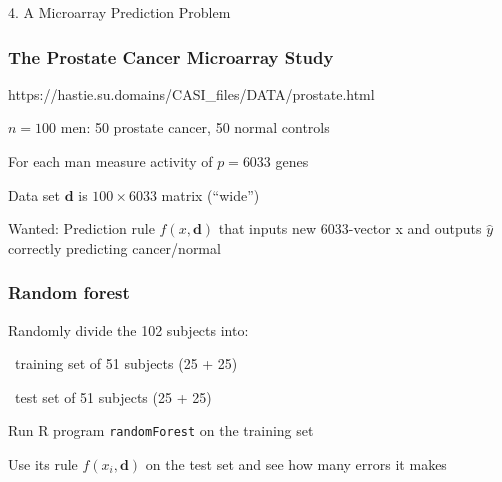 \begin{frame}[fragile]

\be
\item[4.] A Microarray Prediction Problem
\ee

\end{frame}
\begin{frame}[fragile]\frametitle{The Prostate Cancer Microarray Study}

\bi

\item https://hastie.su.domains/CASI\_files/DATA/prostate.html

\item $n = 100$ men: 50 prostate cancer, 50 normal controls

\item For each man measure activity of $p = 6033$ genes

\item Data set $\mathbf{d}$ is $100\times6033$ matrix (``wide'')

\item Wanted: Prediction rule $f(x, \mathbf{d}) $ that inputs new 6033-vector x
and outputs $\hat{y}$ correctly predicting cancer/normal

\ei

\end{frame}
\begin{frame}[fragile]\frametitle{Random forest}

\bi

\item Randomly divide the 102 subjects into:

\bi
\item  training set of 51 subjects (25 + 25)
\item  test set of 51 subjects (25 + 25)
\ei

\item Run R program \texttt{randomForest} on the training set

\item Use its rule $f(x_i, \mathbf{d})$ on the test set and see how many
errors it makes

\ei

\end{frame}
